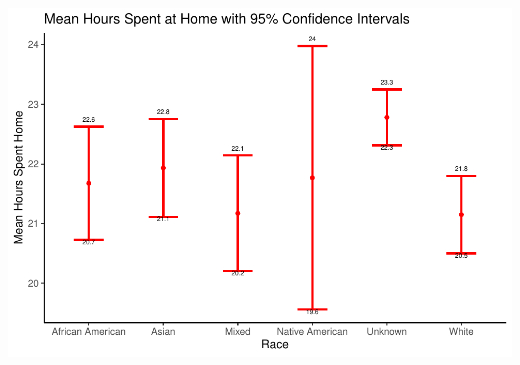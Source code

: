 \documentclass[
  11 pt,
]{article}
\begin{document}
\includegraphics{finalreport_template_files/figure-latex/confidence_interval_plots-1.pdf}
\end{document}
